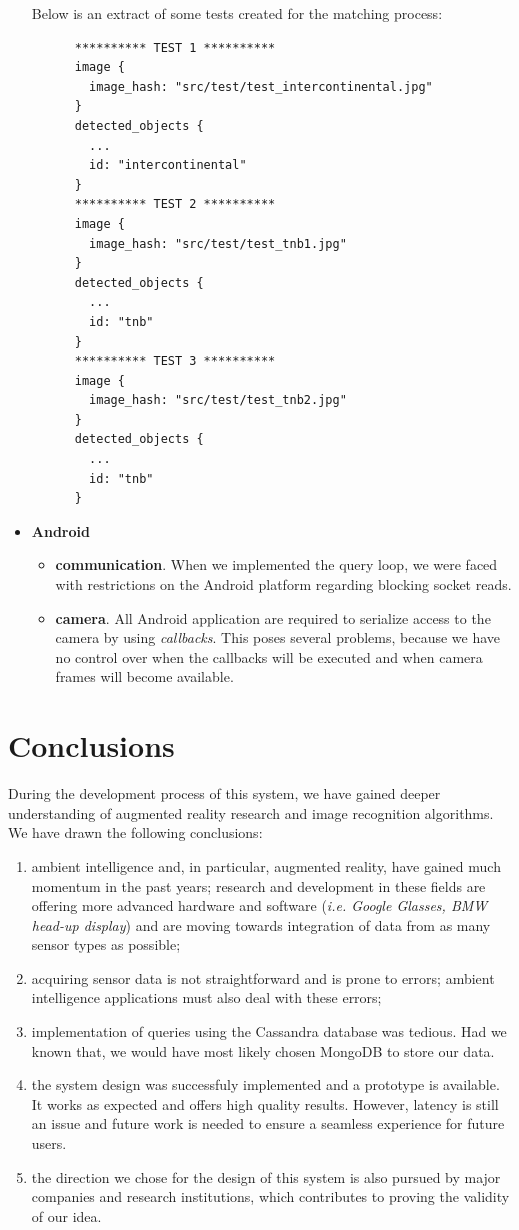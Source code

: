 \documentclass[a4paper,onecolumn,oneside,titlepage,11pt]{report}
\begin{document}
\begin{itemize}
	Below is an extract of some tests created for the matching process:
	\pagebreak
	\begin{verbatim}
	  ********** TEST 1 **********
	  image {
	    image_hash: "src/test/test_intercontinental.jpg"
	  }
	  detected_objects {
	    ...
	    id: "intercontinental"
	  }
	  ********** TEST 2 **********
	  image {
	    image_hash: "src/test/test_tnb1.jpg"
	  }
	  detected_objects {
	    ...
	    id: "tnb"
	  }
	  ********** TEST 3 **********
	  image {
	    image_hash: "src/test/test_tnb2.jpg"
	  }
	  detected_objects {
	    ...
	    id: "tnb"
	  }
	\end{verbatim}
	\item \textbf{Android}
		\begin{itemize}
			\item \textbf{communication}. When we implemented the query loop, we were faced with restrictions on the Android platform regarding blocking socket reads. 
			\item \textbf{camera}. All Android application are required to serialize access to the camera by using \emph{callbacks}. This poses several problems, because we have no control over when the callbacks will be executed and when camera frames will become available.
		\end{itemize}
\end{itemize}
\section{Conclusions}
During the development process of this system, we have gained deeper understanding of augmented reality research and image recognition algorithms. We have drawn the following conclusions:
\begin{enumerate}
	\item ambient intelligence and, in particular, augmented reality, have gained much momentum in the past years; research and development in these fields are offering more advanced hardware and software (\emph{i.e. Google Glasses, BMW head-up display}) and are moving towards integration of data from as many sensor types as possible;
	\item acquiring sensor data is not straightforward and is prone to errors; ambient intelligence applications must also deal with these errors;
	\item implementation of queries using the Cassandra database was tedious. Had we known that, we would have most likely chosen MongoDB to store our data.
	\item the system design was successfuly implemented and a prototype is available. It works as expected and offers high quality results. However, latency is still an issue and future work is needed to ensure a seamless experience for future users. 
	\item the direction we chose for the design of this system is also pursued by major companies and research institutions, which contributes to proving the validity of our idea.
\end{enumerate}
\end{document}
